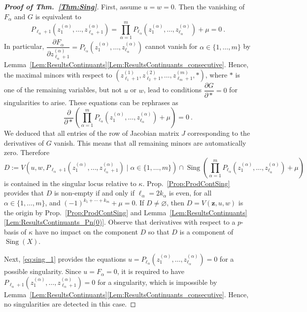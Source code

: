 \documentclass[letter,11pt]{amsart}
\DeclareMathOperator{\Sing}{Sing}
\newcommand{\z}{\boldsymbol{z}}
\newcommand{\XX}{X}
\theoremstyle{theorem}
\theoremstyle{definition}
\newcommand{\len}{\ell}
\newcommand{\halflen}{k}
\numberwithin{equation}{section}
\begin{document}
\begin{proof}[\bf \em Proof of Thm.~\ref{Thm:Sing}]
	First, assume $ u = w = 0 $. 
	Then the vanishing of $ F_\alpha $ and $ G $ is equivalent to  
	\[
		P_{\len_\alpha +1} ( z_1^{(\alpha)}, \ldots, z_{\len_\alpha + 1}^{(\alpha)} )  
		= \displaystyle 
		\prod_{\alpha=1}^m P_{\len_\alpha} ( z_1^{(\alpha)}, \ldots, z_{\len_\alpha}^{(\alpha)} )  + \mu  = 0 
		\ . 
	\]
	In particular, $ \dfrac{\partial F_\alpha}{\partial z_{\len_\alpha+1}^{(\alpha)}} = P_{\len_\alpha} ( z_1^{(\alpha)}, \ldots, z_{\len_\alpha}^{(\alpha)} )  $ cannot vanish for $ \alpha \in \{ 1, \ldots, m \} $
	by Lemma~\ref{Lem:ResultsContinuants}\eqref{Lem:ResultsContinuants_consecutive}.
	Hence, the maximal minors with respect to 
	$ (z_{\len_1+1}^{(1)},z_{\len_2+1}^{(2)}, \ldots, z_{\len_m+1}^{(m)}, *) $,
	where $* $ is one of the remaining variables, but not $ u $ or $ w $,
	lead to conditions
	$ \dfrac{\partial G}{\partial *} = 0 $ 
	for singularities to arise.
	These equations can be rephrases as 
	\[ 
		\frac{\partial}{\partial *} (\displaystyle 
		\prod_{\alpha=1}^m P_{\len_\alpha} ( z_1^{(\alpha)}, \ldots, z_{\len_\alpha}^{(\alpha)} )  + \mu)
		= 0 
		\ . 
	\] 
	We deduced that 
	all entries of the row of Jacobian matrix $ J $ corresponding to the derivatives of $ G $ 
	vanish.
	This means that all remaining minors are automatically zero. 
	Therefore 
	\[
		D := 
		V(u,w, P_{\len_\alpha +1} ( z_1^{(\alpha)}, \ldots, z_{\len_\alpha + 1}^{(\alpha)} ) 
		\mid \alpha \in \{ 1, \ldots, m \})
		\cap 
		\Sing (\prod_{\alpha=1}^m P_{\len_\alpha} ( z_1^{(\alpha)}, \ldots, z_{\len_\alpha}^{(\alpha)} ) + \mu)
	\]
	is contained in the singular locus relative to $ \kappa $.
	Prop.~\ref{Prop:ProdContSing} provides that $ D $ is non-empty if and only if 
	$ \len_\alpha = 2 \halflen_\alpha $ is even, for all $ \alpha \in \{ 1, \ldots, m \} $,
	and $ (-1)^{\halflen_1 + \cdots + \halflen_m} + \mu  = 0 $.
	If  $ D \neq \varnothing $, then $ D = V(\z, u,w) $ is the origin by
	Prop.~\ref{Prop:ProdContSing} and  Lemma~\ref{Lem:ResultsContinuants}\eqref{Lem:ResultsContinuants_Pn(0)}.
	Observe that derivatives with respect to a $ p $-basis of $ \kappa $  have no impact on the component $ D $ so that $ D $ is a component of $ \Sing (\XX) $. 
		
	Next, \eqref{eq:sing_1} provides the equations  
	$ u = P_{\len_\alpha} (z_1^{(\alpha)}, \ldots, z_{\len_\alpha}^{(\alpha)}) = 0 $  %
	for a possible singularity. 
	Since $ u = F_\alpha = 0 $,
	it is required to have
	$ P_{\len_\alpha +1} ( z_1^{(\alpha)}, \ldots, z_{\len_\alpha + 1}^{(\alpha)} ) = 0 $
	for a singularity,
	which is impossible 
	by Lemma~\ref{Lem:ResultsContinuants}\eqref{Lem:ResultsContinuants_consecutive}.
	Hence, no singularities are detected in this case. 
	

\end{proof}
\end{document}
